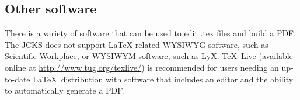 \documentclass[12pt]{article}
\begin{document}
\subsection{Other software}
There is a variety of software that can be used to edit .tex files and build a PDF.  The JCKS does not support \LaTeX\/-related WYSIWYG software, such as Scientific Workplace, or WYSIWYM software, such as LyX.  \TeX\ Live (available online at \url{http://www.tug.org/texlive/}) is recommended for users needing an up-to-date \LaTeX\ distribution with software that includes an editor and the ability to automatically generate a PDF.
\end{document}
